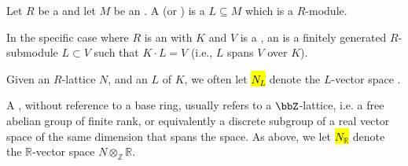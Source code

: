 \begin{definition} \label{definition:lattice_over_a_commutative_ring}
Let $R$ be a  and let $M$ be an . A  (or ) is a  $L \subseteq M$ which is a   $R$-module. 

In the specific case where $R$ is an  with  $K$ and $V$ is a  , an  is a finitely generated $R$-submodule $L \subset V$ such that $K \cdot L = V$ (i.e., $L$ spans $V$ over $K$).

Given an $R$-lattice $N$, and an  $L$ of $K$, we often let \hl{$N_L$} denote the $L$-vector space . 

A , without reference to a base ring, usually refers to a $\bbZ$-lattice, i.e. a free abelian group of finite rank, or equivalently a discrete subgroup of a real vector space of the same dimension that spans the space. As above, we let \hl{$N_\mathbb{R}$} denote the $\mathbb{R}$-vector space $N \otimes_\mathbb{Z} \mathbb{R}$. 
\end{definition}
